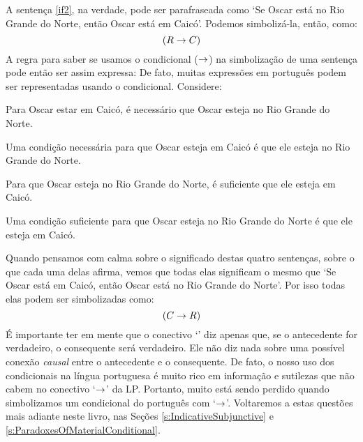 A sentença \ref{if2}, na verdade, pode ser parafraseada como `Se Oscar está no Rio Grande do Norte, então Oscar está em Caicó'.
Podemos simbolizá-la, então, como:
$$(R \rightarrow C)$$
A regra para saber se usamos o condicional ($\rightarrow$) na simbolização de uma sentença pode então ser assim expressa:
\noindent De fato, muitas expressões em português podem ser representadas usando o condicional. Considere:
	\begin{earg}
		\item[\ex{ifnec1}] Para Oscar estar em Caicó, é necessário que Oscar esteja no Rio Grande do Norte.
		\item[\ex{ifnec2}] Uma condição necessária para que Oscar esteja em Caicó é que ele esteja no Rio Grande do Norte.
		\item[\ex{ifsuf1}] Para que Oscar esteja no Rio Grande do Norte, é suficiente que ele esteja em Caicó.
		\item[\ex{ifsuf2}] Uma condição suficiente para que Oscar esteja no Rio Grande do Norte é que ele esteja em Caicó.
	\end{earg}
Quando pensamos com calma sobre o significado destas quatro sentenças, sobre o que cada uma delas afirma, vemos que todas elas significam o mesmo que `Se Oscar está em Caicó, então Oscar está no Rio Grande do Norte'.
Por isso todas elas podem ser simbolizadas como:
$$(C \rightarrow R)$$
É importante ter em mente que o conectivo `\eif' diz apenas que, se o antecedente for verdadeiro, o consequente será verdadeiro.
Ele não diz nada sobre uma possível conexão \emph{causal} entre o antecedente e o consequente.
De fato, o nosso uso dos condicionais na língua portuguesa é muito rico em informação e sutilezas que não cabem no conectivo `$\rightarrow$' da LP.
Portanto, muito está sendo perdido quando simbolizamos um condicional do português com `$\rightarrow$'.
Voltaremos a estas questões mais adiante neste livro, nas Seções \ref{s:IndicativeSubjunctive} e \ref{s:ParadoxesOfMaterialConditional}.



